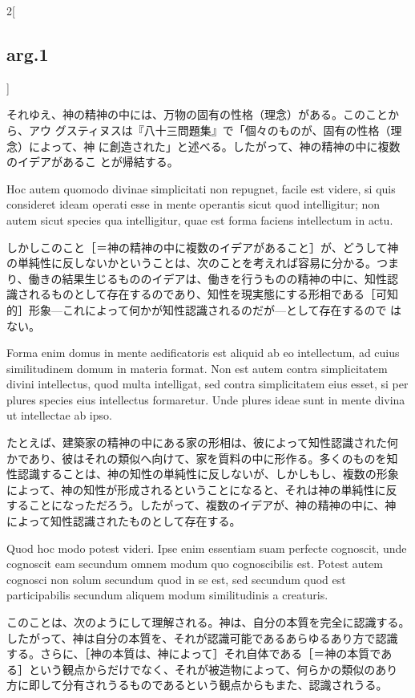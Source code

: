 \documentclass[paper=a4paper,fontsize=10pt,jafontsize=9pt,titlepage]{jlreq}
\begin{document}
\begin{paracol}{2}[\subsection{arg.1}]
\switchcolumn

それゆえ、神の精神の中には、万物の固有の性格（理念）がある。このことから、アウ
グスティヌスは『八十三問題集』で「個々のものが、固有の性格（理念）によって、神
に創造された」と述べる。したがって、神の精神の中に複数のイデアがあるこ
とが帰結する。

\switchcolumn*

Hoc autem quomodo divinae simplicitati non repugnet, facile est
videre, si quis consideret ideam operati esse in mente operantis sicut
quod intelligitur; non autem sicut species qua intelligitur, quae est
forma faciens intellectum in actu.

\switchcolumn

しかしこのこと［＝神の精神の中に複数のイデアがあること］が、どうして神
の単純性に反しないかということは、次のことを考えれば容易に分かる。つま
り、働きの結果生じるもののイデアは、働きを行うものの精神の中に、知性認
識されるものとして存在するのであり、知性を現実態にする形相である［可知
的］形象---これによって何かが知性認識されるのだが---として存在するので
はない。

\switchcolumn*

Forma enim domus in mente aedificatoris est aliquid ab eo intellectum,
ad cuius similitudinem domum in materia format. Non est autem contra
simplicitatem divini intellectus, quod multa intelligat, sed contra
simplicitatem eius esset, si per plures species eius intellectus
formaretur. Unde plures ideae sunt in mente divina ut intellectae ab
ipso.

\switchcolumn

たとえば、建築家の精神の中にある家の形相は、彼によって知性認識された何
かであり、彼はそれの類似へ向けて、家を質料の中に形作る。多くのものを知
性認識することは、神の知性の単純性に反しないが、しかしもし、複数の形象
によって、神の知性が形成されるということになると、それは神の単純性に反
することになっただろう。したがって、複数のイデアが、神の精神の中に、神
によって知性認識されたものとして存在する。

\switchcolumn*

Quod hoc modo potest videri. Ipse enim essentiam suam perfecte
cognoscit, unde cognoscit eam secundum omnem modum quo cognoscibilis
est. Potest autem cognosci non solum secundum quod in se est, sed
secundum quod est participabilis secundum aliquem modum similitudinis
a creaturis.

\switchcolumn

このことは、次のようにして理解される。神は、自分の本質を完全に認識する。
したがって、神は自分の本質を、それが認識可能であるあらゆるあり方で認識
する。さらに、［神の本質は、神によって］それ自体である［＝神の本質であ
る］という観点からだけでなく、それが被造物によって、何らかの類似のあり
方に即して分有されうるものであるという観点からもまた、認識されうる。


\end{paracol}
\end{document}
